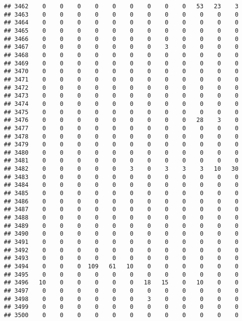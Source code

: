\documentclass[]{article}
\begin{document}
\begin{verbatim}
## 3462    0    0    0    0    0    0    0    0    0   53   23    3
## 3463    0    0    0    0    0    0    0    0    0    0    0    0
## 3464    0    0    0    0    0    0    0    0    0    0    0    0
## 3465    0    0    0    0    0    0    0    0    0    0    0    0
## 3466    0    0    0    0    0    0    0    0    0    0    0    0
## 3467    0    0    0    0    0    0    0    3    0    0    0    0
## 3468    0    0    0    0    0    0    0    0    0    0    0    0
## 3469    0    0    0    0    0    0    0    0    0    0    0    0
## 3470    0    0    0    0    0    0    0    0    0    0    0    0
## 3471    0    0    0    0    0    0    0    0    0    0    0    0
## 3472    0    0    0    0    0    0    0    0    0    0    0    0
## 3473    0    0    0    0    0    0    0    0    0    0    0    0
## 3474    0    0    0    0    0    0    0    0    0    0    0    0
## 3475    0    0    0    0    0    0    0    0    0    0    0    0
## 3476    0    0    0    0    0    0    0    0    0   28    3    0
## 3477    0    0    0    0    0    0    0    0    0    0    0    0
## 3478    0    0    0    0    0    0    0    0    0    0    0    0
## 3479    0    0    0    0    0    0    0    0    0    0    0    0
## 3480    0    0    0    0    0    0    0    0    0    0    0    0
## 3481    0    0    0    0    0    0    0    0    0    0    0    0
## 3482    0    0    0    0    0    3    0    3    3    3   10   30
## 3483    0    0    0    0    0    0    0    0    0    0    0    0
## 3484    0    0    0    0    0    0    0    0    0    0    0    0
## 3485    0    0    0    0    0    0    0    0    0    0    0    0
## 3486    0    0    0    0    0    0    0    0    0    0    0    0
## 3487    0    0    0    0    0    0    0    0    0    0    0    0
## 3488    0    0    0    0    0    0    0    0    0    0    0    0
## 3489    0    0    0    0    0    0    0    0    0    0    0    0
## 3490    0    0    0    0    0    0    0    0    0    0    0    0
## 3491    0    0    0    0    0    0    0    0    0    0    0    0
## 3492    0    0    0    0    0    0    0    0    0    0    0    0
## 3493    0    0    0    0    0    0    0    0    0    0    0    0
## 3494    0    0    0  109   61   10    0    0    0    0    0    0
## 3495    0    0    0    0    0    0    0    0    0    0    0    0
## 3496   10    0    0    0    0    0   18   15    0   10    0    0
## 3497    0    0    0    0    0    0    0    0    0    0    0    0
## 3498    0    0    0    0    0    0    3    0    0    0    0    0
## 3499    0    0    0    0    0    0    0    0    0    0    0    0
## 3500    0    0    0    0    0    0    0    0    0    0    0    0

\end{verbatim}
\end{document}
